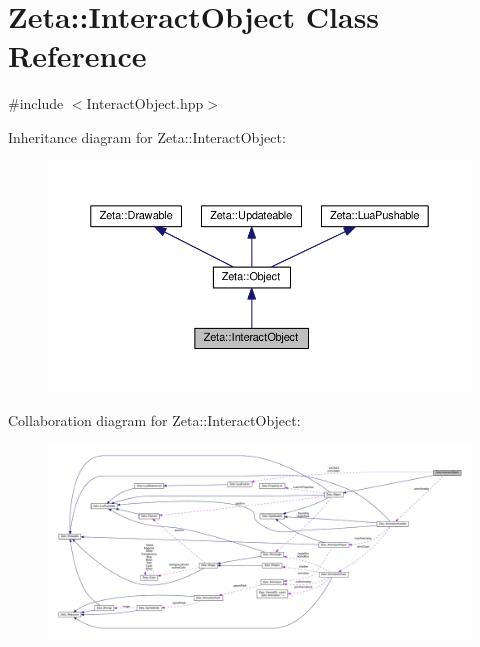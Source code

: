 \hypertarget{classZeta_1_1InteractObject}{\section{Zeta\+:\+:Interact\+Object Class Reference}
\label{classZeta_1_1InteractObject}
}


{\ttfamily \#include $<$Interact\+Object.\+hpp$>$}



Inheritance diagram for Zeta\+:\+:Interact\+Object\+:\nopagebreak
\begin{figure}[H]
\begin{center}
\leavevmode
\includegraphics[width=350pt]{classZeta_1_1InteractObject__inherit__graph}
\end{center}
\end{figure}


Collaboration diagram for Zeta\+:\+:Interact\+Object\+:
\nopagebreak
\begin{figure}[H]
\begin{center}
\leavevmode
\includegraphics[width=350pt]{classZeta_1_1InteractObject__coll__graph}
\end{center}
\end{figure}
